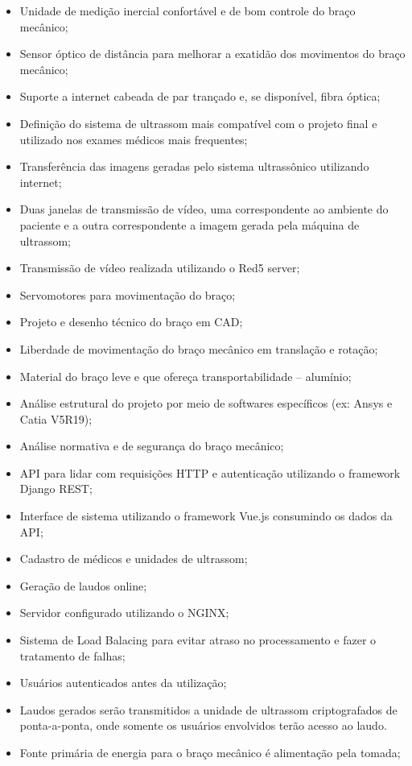 \begin{itemize}
\item Unidade de medição inercial confortável e de bom controle do braço mecânico;
\item Sensor óptico de distância para melhorar a exatidão dos movimentos do braço mecânico;
\item Suporte a internet cabeada de par trançado e, se disponível, fibra óptica;
\item Definição do sistema de ultrassom mais compatível com o projeto final e utilizado nos exames médicos mais frequentes;
\item Transferência das imagens geradas pelo sistema ultrassônico utilizando internet;
\item Duas janelas de transmissão de vídeo, uma correspondente ao ambiente do paciente e a outra correspondente a imagem gerada pela máquina de ultrassom;
\item Transmissão de vídeo realizada utilizando o Red5 server;
\item Servomotores para movimentação do braço;
\item Projeto e desenho técnico do braço em CAD;
\item Liberdade de movimentação do braço mecânico em translação e rotação;
\item Material do braço leve e que ofereça transportabilidade – alumínio;
\item Análise estrutural do projeto por meio de softwares específicos (ex: Ansys e Catia V5R19);
\item Análise normativa e de segurança do braço mecânico;
\item API para lidar com requisições HTTP e autenticação utilizando o framework Django REST;
\item Interface de sistema utilizando o framework Vue.js consumindo os dados da API;
\item Cadastro de médicos e unidades de ultrassom;
\item Geração de laudos online;
\item Servidor configurado utilizando o NGINX;
\item Sistema de Load Balacing para evitar atraso no processamento e fazer o tratamento de falhas;
\item Usuários autenticados antes da utilização;
\item Laudos gerados serão transmitidos a unidade de ultrassom criptografados de ponta-a-ponta, onde somente os usuários envolvidos terão acesso ao laudo.
\item Fonte primária de energia para o braço mecânico é alimentação pela tomada;

\end{itemize}
